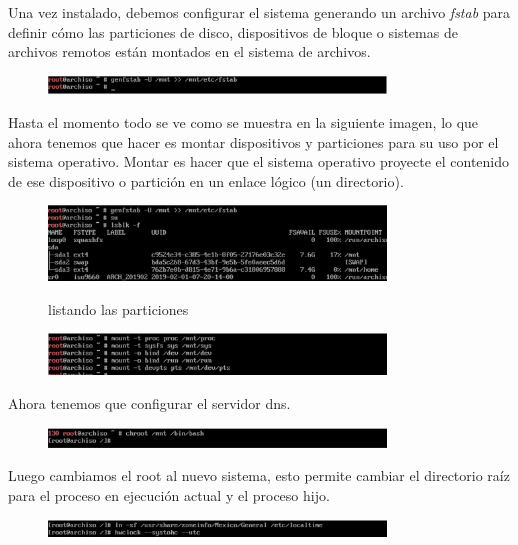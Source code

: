 \documentclass[11pt,letterpaper]{article}
\begin{document}
Una vez instalado, debemos configurar el sistema generando un archivo \textit{fstab} para definir cómo las particiones de disco, dispositivos de bloque o sistemas de archivos remotos están montados en el sistema de archivos.
\begin{figure}[H]
        \centering
        \includegraphics[width=0.8\textwidth]{img/13.png}
        \label{img:Imagen 4}
\end{figure}

Hasta el momento todo se ve como se muestra en la siguiente imagen, lo que ahora tenemos que hacer es montar dispositivos y particiones para su uso por el sistema operativo. Montar es hacer que el sistema operativo proyecte el contenido de ese dispositivo o partición en un enlace lógico (un directorio). 
\begin{figure}[H]
        \centering
        \includegraphics[width=0.8\textwidth]{img/14.png}
        \label{img:Imagen 4}
        \caption{listando las particiones}
\end{figure}

\begin{figure}[H]
        \centering
        \includegraphics[width=0.8\textwidth]{img/15.png}
        \label{img:Imagen 4}
\end{figure}
Ahora tenemos que configurar el servidor dns.
\begin{figure}[H]
        \centering
        \includegraphics[width=0.8\textwidth]{img/17.png}
        \label{img:Imagen 4}
\end{figure}
Luego cambiamos el root al nuevo sistema, esto permite cambiar el directorio raíz para el proceso en ejecución actual y el proceso hijo.
\begin{figure}[H]
        \centering
        \includegraphics[width=0.8\textwidth]{img/18.png}
        \label{img:Imagen 4}
\end{figure}
\end{document}
